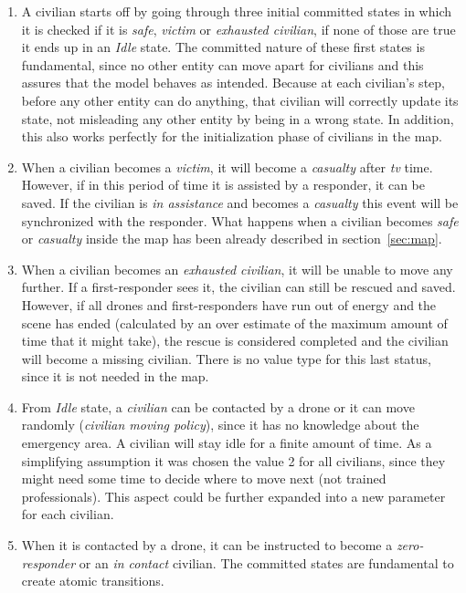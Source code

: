 \begin{enumerate}
	\item A civilian starts off by going through three initial committed states in which it is checked if it is \textit{safe}, \textit{victim} or \textit{exhausted civilian}, if none of those are true it ends up in an \textit{Idle} state. The committed nature of these first states is fundamental, since no other entity can move apart for civilians and this assures that the model behaves as intended. Because at each civilian's step, before any other entity can do anything, that civilian will correctly update its state, not misleading any other entity by being in a wrong state. In addition, this also works perfectly for the initialization phase of civilians in the map.
	
	\item When a civilian becomes a \textit{victim}, it will become a \textit{casualty} after \textit{tv} time. However, if in this period of time it is assisted by a responder, it can be saved. If the civilian is \textit{in assistance} and becomes a \textit{casualty} this event will be synchronized with the responder. What happens when a civilian becomes \textit{safe} or \textit{casualty} inside the map has been already described in section~\ref{sec:map}.
	
	\item When a civilian becomes an \textit{exhausted civilian}, it will be unable to move any further. If a first-responder sees it, the civilian can still be rescued and saved. However, if all drones and first-responders have run out of energy and the scene has ended (calculated by an over estimate of the maximum amount of time that it might take), the rescue is considered completed and the civilian will become a missing civilian. There is no value type for this last status, since it is not needed in the map.
	
	\item From \textit{Idle} state, a \textit{civilian} can be contacted by a drone or it can move randomly (\textit{civilian moving policy}), since it has no knowledge about the emergency area. A civilian will stay idle for a finite amount of time. As a simplifying assumption it was chosen the value 2 for all civilians, since they might need some time to decide where to move next (not trained professionals). This aspect could be further expanded into a new parameter for each civilian. 
	
	\item When it is contacted by a drone, it can be instructed to become a \textit{zero-responder} or an \textit{in contact} civilian. The committed states are fundamental to create atomic transitions.
	

\end{enumerate}

